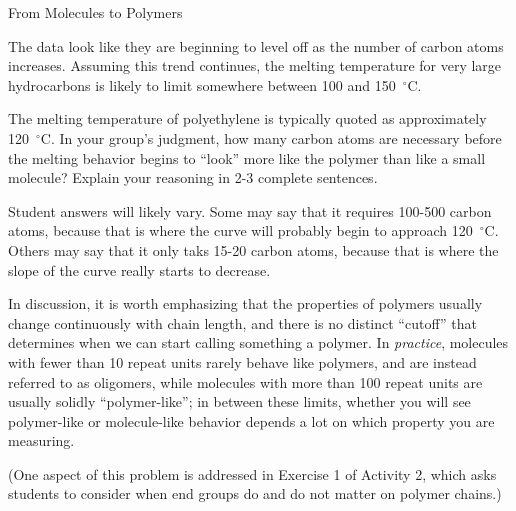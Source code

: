 \begin{activity}{From Molecules to Polymers}
\begin{ctqs}
		\begin{solution}[2in]{}
		
			The data look like they are beginning to level off as the number of carbon atoms increases.  Assuming this trend continues, the melting temperature for very large hydrocarbons is likely to limit somewhere between 100 and 150~${}^\circ$C. 
		\end{solution}
	
	\question The melting temperature of polyethylene is typically quoted as approximately 120~${}^\circ$C.  In your group's judgment, how many carbon atoms are necessary before the melting behavior begins to ``look'' more like the polymer than like a small molecule?  Explain your reasoning in 2-3 complete sentences. \label{\labelbase:ctq:npolymer}
	
		\begin{solution}[2in]{}
		
			Student answers will likely vary.  Some may say that it requires 100-500 carbon atoms, because that is where the curve will probably begin to approach 120~${}^\circ$C.  Others may say that it only taks 15-20 carbon atoms, because that is where the slope of the curve really starts to decrease.
			
			In discussion, it is worth emphasizing that the properties of polymers usually change continuously with chain length, and there is no distinct ``cutoff'' that determines when we can start calling something a polymer.  In \emph{practice}, molecules with fewer than 10 repeat units rarely behave like polymers, and are instead referred to as oligomers, while molecules with more than 100 repeat units are usually solidly ``polymer-like''; in between these limits, whether you will see polymer-like or molecule-like behavior depends a lot on which property you are measuring.
			
			(One aspect of this problem is addressed in Exercise 1 of Activity 2, which asks students to consider when end groups do and do not matter on polymer chains.)
		\end{solution}
	
	
			
\end{ctqs}

		

\begin{exercises}


\end{exercises}
\end{activity}
